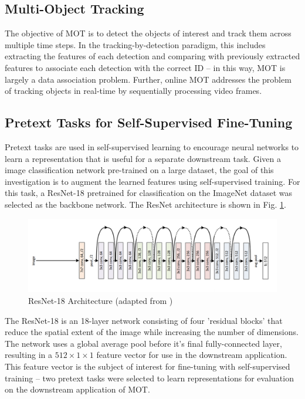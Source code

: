 \documentclass[10pt,twocolumn,letterpaper]{article}
\begin{document}
\subsection{Multi-Object Tracking}
The objective of MOT is to detect the objects of interest and track them across multiple time steps. In the tracking-by-detection paradigm, this includes extracting the features of each detection and comparing with previously extracted features to associate each detection with the correct ID -- in this way, MOT is largely a data association problem. Further, online MOT addresses the problem of tracking objects in real-time by sequentially processing video frames.

\subsection{Pretext Tasks for Self-Supervised Fine-Tuning}
Pretext tasks are used in self-supervised learning to encourage neural networks to learn a representation that is useful for a separate downstream task. Given a image classification network pre-trained on a large dataset, the goal of this investigation is to augment the learned features using self-supervised training. For this task, a ResNet-18 \cite{Resnet} pretrained for classification on the ImageNet dataset \cite{imagenet_cvpr09} was selected as the backbone network. The ResNet architecture is shown in Fig. \ref{fig:resnet}.

\begin{figure}[h!]
    \centering
\includegraphics[width=\linewidth]{docs/reports/figs/resnet18.png}
    \caption{ResNet-18 Architecture (adapted from \cite{Resnet})}
    \label{fig:resnet}
\end{figure}

The ResNet-18 is an 18-layer network consisting of four 'residual blocks' that reduce the spatial extent of the image while increasing the number of dimensions. The network uses a global average pool before it's final fully-connected layer, resulting in a $512\times1\times1$ feature vector for use in the downstream application. This feature vector is the subject of interest for fine-tuning with self-supervised training -- two pretext tasks were selected to learn representations for evaluation on the downstream application of MOT.
\end{document}
